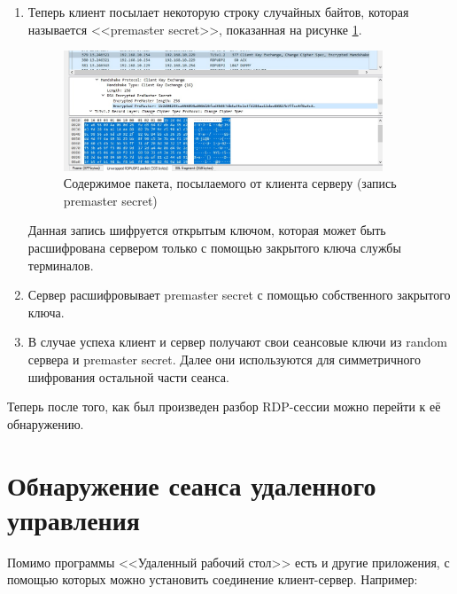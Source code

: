 \documentclass[bachelor, och, coursework]{SCWorks}
\begin{document}
\begin{enumerate}
    \item Теперь клиент посылает некоторую строку случайных байтов, которая называется <<premaster secret>>, показанная на рисунке \ref{cert1}. 
    
    \begin{figure}[H]
      \centering
      \includegraphics[width=0.9\textwidth]{photo/cert1.png}
      \caption{Содержимое пакета, посылаемого от клиента серверу (запись premaster secret)}
      \label{cert1}
    \end{figure}
    
    Данная запись шифруется открытым ключом, которая может быть расшифрована сервером только с помощью закрытого ключа службы терминалов.
    \item Сервер расшифровывает premaster secret с помощью собственного закрытого ключа.
    \item В случае успеха клиент и сервер получают свои сеансовые ключи из random сервера и premaster secret. Далее они используются для симметричного 
    шифрования остальной части сеанса.
  \end{enumerate}

  Теперь после того, как был произведен разбор RDP-сессии можно перейти к её обнаружению.

  
  \section{Обнаружение сеанса удаленного управления}

  Помимо программы <<Удаленный рабочий стол>> есть и другие приложения, с помощью которых можно установить соединение клиент-сервер. Например:
  
\end{document}
